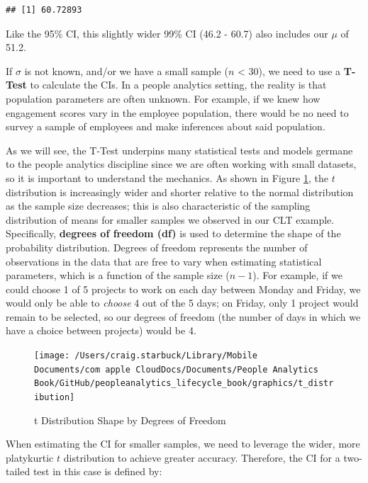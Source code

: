 \documentclass[]{book}
\begin{document}
\begin{verbatim}
## [1] 60.72893
\end{verbatim}

Like the 95\% CI, this slightly wider 99\% CI (46.2 - 60.7) also includes our \(\mu\) of 51.2.

If \(\sigma\) is not known, and/or we have a small sample (\(n\) \textless{} 30), we need to use a \textbf{T-Test} to calculate the CIs. In a people analytics setting, the reality is that population parameters are often unknown. For example, if we knew how engagement scores vary in the employee population, there would be no need to survey a sample of employees and make inferences about said population.

As we will see, the T-Test underpins many statistical tests and models germane to the people analytics discipline since we are often working with small datasets, so it is important to understand the mechanics. As shown in Figure \ref{fig:t-distribution}, the \(t\) distribution is increasingly wider and shorter relative to the normal distribution as the sample size decreases; this is also characteristic of the sampling distribution of means for smaller samples we observed in our CLT example. Specifically, \textbf{degrees of freedom (df)} is used to determine the shape of the probability distribution. Degrees of freedom represents the number of observations in the data that are free to vary when estimating statistical parameters, which is a function of the sample size (\(n - 1\)). For example, if we could choose 1 of 5 projects to work on each day between Monday and Friday, we would only be able to \emph{choose} 4 out of the 5 days; on Friday, only 1 project would remain to be selected, so our degrees of freedom (the number of days in which we have a choice between projects) would be 4.

\begin{figure}

{\centering \texttt{[image: /Users/craig.starbuck/Library/Mobile Documents/com~apple~CloudDocs/Documents/People Analytics Book/GitHub/peopleanalytics\_lifecycle\_book/graphics/t\_distribution]} 

}

\caption{t Distribution Shape by Degrees of Freedom}\label{fig:t-distribution}
\end{figure}

When estimating the CI for smaller samples, we need to leverage the wider, more platykurtic \(t\) distribution to achieve greater accuracy. Therefore, the CI for a two-tailed test in this case is defined by:
\end{document}
